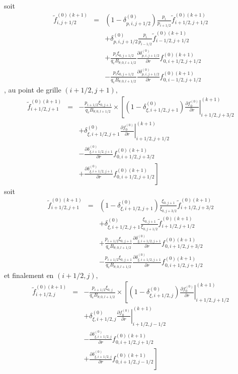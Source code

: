  soit \begin{eqnarray*}
\widetilde{f}_{i,j+1/2}^{\left(0\right)(k+1)} & = & \left(1-\delta_{p,i,j+1/2}^{(0)}\right)\frac{p_{i}}{p_{i+1/2}}\widetilde{f}_{i+1/2,j+1/2}^{\left(0\right)(k+1)}\\
 &  & +\delta_{p,i,j+1/2}^{(0)}\frac{p_{i}}{p_{i-1/2}}\widetilde{f}_{i-1/2,j+1/2}^{\left(0\right)(k+1)}\\
 &  & +\frac{p_{i}\xi_{0,j+1/2}}{q_{e}B_{\theta,0,l+1/2}}\frac{\partial\delta_{p,i,j+1/2}^{(0)}}{\partial r}f_{0,i+1/2,j+1/2}^{\left(0\right)(k+1)}\\
 &  & -\frac{p_{i}\xi_{0,j+1/2}}{q_{e}B_{\theta,0,l+1/2}}\frac{\partial\delta_{p,i,j+1/2}^{(0)}}{\partial r}f_{0,i-1/2,j+1/2}^{\left(0\right)(k+1)}\end{eqnarray*}
 , au point de grille $\left(i+1/2,j+1\right),$\begin{eqnarray*}
\widetilde{f}_{i+1/2,j+1}^{\left(0\right)(k+1)} & = & -\frac{p_{i+1/2}\xi_{0,j+1}}{q_{e}B_{\theta,0,l+1/2}}\times\left[\left(1-\delta_{\xi,i+1/2,j+1}^{(0)}\right)\left.\frac{\partial f_{0}^{(0)}}{\partial r}\right|_{i+1/2,j+3/2}^{(k+1)}\right.\\
 &  & +\delta_{\xi,i+1/2,j+1}^{(0)}\left.\frac{\partial f_{0}^{(0)}}{\partial r}\right|_{i+1/2,j+1/2}^{(k+1)}\\
 &  & -\frac{\partial\delta_{\xi,i+1/2,j+1}^{(0)}}{\partial r}f_{0,i+1/2,j+3/2}^{\left(0\right)(k+1)}\\
 &  & \left.+\frac{\partial\delta_{\xi,i+1/2,j+1}^{(0)}}{\partial r}f_{0,i+1/2,j+1/2}^{\left(0\right)(k+1)}\right]\end{eqnarray*}
 soit \begin{eqnarray*}
\widetilde{f}_{i+1/2,j+1}^{\left(0\right)(k+1)} & = & \left(1-\delta_{\xi,i+1/2,j+1}^{(0)}\right)\frac{\xi_{0,j+1}}{\xi_{0,j+3/2}}\widetilde{f}_{i+1/2,j+3/2}^{\left(0\right)(k+1)}\\
 &  & +\delta_{\xi,i+1/2,j+1}^{(0)}\frac{\xi_{0,j+1}}{\xi_{0,j+1/2}}\widetilde{f}_{i+1/2,j+1/2}^{\left(0\right)(k+1)}\\
 &  & +\frac{p_{i+1/2}\xi_{0,j+1}}{q_{e}B_{\theta,0,l+1/2}}\frac{\partial\delta_{\xi,i+1/2,j+1}^{(0)}}{\partial r}f_{0,i+1/2,j+3/2}^{\left(0\right)(k+1)}\\
 &  & -\frac{p_{i+1/2}\xi_{0,j+1}}{q_{e}B_{\theta,0,l+1/2}}\frac{\partial\delta_{\xi,i+1/2,j+1}^{(0)}}{\partial r}f_{0,i+1/2,j+1/2}^{\left(0\right)(k+1)}\end{eqnarray*}
 et finalement en $\left(i+1/2,j\right),$\begin{eqnarray*}
\widetilde{f}_{i+1/2,j}^{\left(0\right)(k+1)} & = & -\frac{p_{i+1/2}\xi_{0,j}}{q_{e}B_{\theta,0,l+1/2}}\times\left[\left(1-\delta_{\xi,i+1/2,j}^{(0)}\right)\left.\frac{\partial f_{0}^{(0)}}{\partial r}\right|_{i+1/2,j+1/2}^{(k+1)}\right.\\
 &  & +\delta_{\xi,i+1/2,j}^{(0)}\left.\frac{\partial f_{0}^{(0)}}{\partial r}\right|_{i+1/2,j-1/2}^{(k+1)}\\
 &  & -\frac{\partial\delta_{\xi,i+1/2,j}^{(0)}}{\partial r}f_{0,i+1/2,j+1/2}^{\left(0\right)(k+1)}\\
 &  & \left.+\frac{\partial\delta_{\xi,i+1/2,j}^{(0)}}{\partial r}f_{0,i+1/2,j-1/2}^{\left(0\right)(k+1)}\right]\end{eqnarray*}
